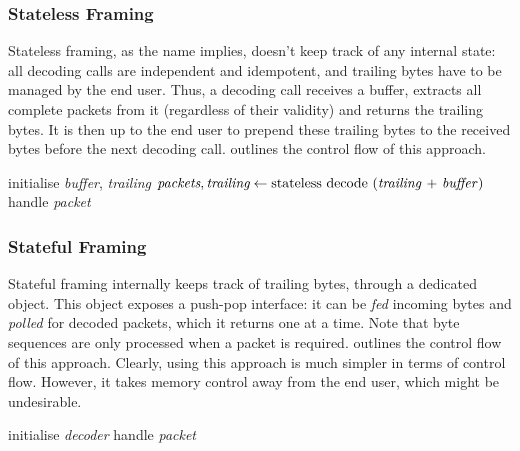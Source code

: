 \documentclass[a4paper,11pt,english]{article}
\begin{document}
\subsubsection[dec:stateless]{Stateless Framing}
Stateless framing, as the name implies, doesn't keep track of any internal state: all decoding calls are independent and idempotent, and trailing bytes have to be managed by the end user. Thus, a decoding call receives a buffer, extracts all complete packets from it (regardless of their validity) and returns the trailing bytes. It is then up to the end user to prepend these trailing bytes to the received bytes before the next decoding call.  outlines the control flow of this approach.

\begin{algorithm}[h]
  \caption{Control Flow of Stateless Framing}\label{listing:dec-stateless}
  \begin{algorithmic}
    \State initialise \textit{buffer}, \textit{trailing}
    \State $\textit{packets}, \textit{trailing} \gets \textrm{stateless decode (\textit{trailing} + \textit{buffer})}$
    \State handle \textit{packet}
    \EndFor
    \EndWhile
  \end{algorithmic}
\end{algorithm}

\subsubsection[dec:stateful]{Stateful Framing}
Stateful framing internally keeps track of trailing bytes, through a dedicated object. This object exposes a push-pop interface: it can be \textit{fed} incoming bytes and \textit{polled} for decoded packets, which it returns one at a time. Note that byte sequences are only processed when a packet is required.  outlines the control flow of this approach. Clearly, using this approach is much simpler in terms of control flow. However, it takes memory control away from the end user, which might be undesirable.

\begin{algorithm}[h]
  \caption{Control Flow of Stateful Framing}\label{listing:dec-stateful}
  \begin{algorithmic}
    \State initialise \textit{decoder}
    \State handle \textit{packet}
    \EndWhile
    \EndWhile
  \end{algorithmic}
\end{algorithm}
\end{document}
